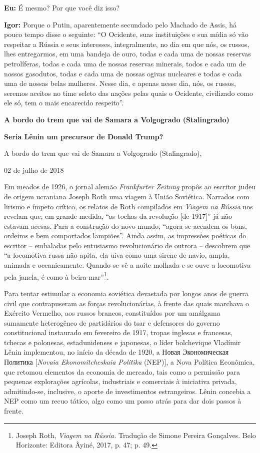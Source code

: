 \textbf{Eu:} É mesmo? Por que você diz isso?

\textbf{Igor:} Porque o Putin, aparentemente secundado pelo Machado de
Assis, há pouco tempo disse o seguinte: ``O Ocidente, suas instituições
e sua mídia só vão respeitar a Rússia e seus interesses, integralmente,
no dia em que nós, os russos, lhes entregarmos, em uma bandeja de ouro,
todas e cada uma de nossas reservas petrolíferas, todas e cada uma de
nossas reservas minerais, todos e cada um de nossos gasodutos, todas e
cada uma de nossas ogivas nucleares e todas e cada uma de nossas belas
mulheres. Nesse dia, e apenas nesse dia, nós, os russos, seremos aceitos
no time seleto das nações pelas quais o Ocidente, civilizado como ele
só, tem o mais encarecido respeito''.

\textbf{A bordo do trem que vai de Samara a Volgogrado (Stalingrado)}

\textbf{Seria Lênin um precursor de Donald Trump?}

A bordo do trem que vai de Samara a Volgogrado (Stalingrado),

02 de julho de 2018

Em meados de 1926, o jornal alemão \emph{Frankfurter Zeitung} propôs ao
escritor judeu de origem ucraniana Joseph Roth uma viagem à União
Soviética. Narrados com lirismo e ímpeto crítico, os relatos de Roth
compilados em \emph{Viagem na Rússia} nos revelam que, em grande medida,
``as tochas da revolução {[}de 1917{]}'' já não estavam acesas. Para a
construção do novo mundo, ``agora se acendem os bons, ordeiros e bem
comportados lampiões''. Ainda assim, as impressões poéticas do escritor
-- embaladas pelo entusiasmo revolucionário de outrora -- descobrem que
``a locomotiva russa não apita, ela uiva como uma sirene de navio,
ampla, animada e oceanicamente. Quando se vê a noite molhada e se ouve a
locomotiva pela janela, é como à beira-mar''\footnote{Joseph Roth,
  \emph{Viagem na Rússia.} Tradução de Simone Pereira Gonçalves. Belo
  Horizonte: Editora Âyiné, 2017, p. 47; p. 49.}.

Para tentar estimular a economia soviética devastada por longos anos de
guerra civil que contrapuseram as forças revolucionárias, à frente das
quais marchava o Exército Vermelho, aos russos brancos, constituídos por
um amálgama sumamente heterogêneo de partidários do tsar e defensores do
governo constitucional instaurado em fevereiro de 1917, tropas inglesas
e francesas, tchecas e polonesas, estadunidenses e japonesas, o líder
bolchevique Vladímir Lênin implementou, no início da década de 1920, a
Новая Экономическая Политика {[}\emph{Novaia Ekonomitcheskaia Politika}
(NEP){]}, a Nova Política Econômica, que retomou elementos da economia
de mercado, tais como a permissão para pequenas explorações agrícolas,
industriais e comerciais à iniciativa privada, admitindo-se, inclusive,
o aporte de investimentos estrangeiros. Lênin concebia a NEP como um
recuo tático, algo como um passo atrás para dar dois passos à frente.

